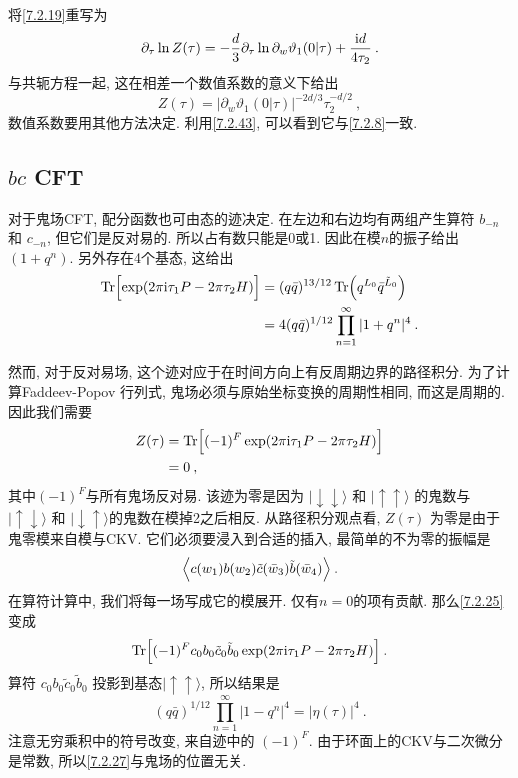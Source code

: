 将\eqref{7.2.19}重写为
\begin{equation}
\partial_{\tau} \ln Z(\tau)=-\frac{d}{3} \partial_{\tau} \ln \partial_{w} \vartheta_{1}(0 \vert \tau)+\frac{\mathrm{i} d}{4 \tau_{2}} \:. \label{7.2.21}
\end{equation}
与共轭方程一起, 这在相差一个数值系数的意义下给出
\begin{equation}
Z(\tau)=|\partial_{w} \vartheta_{1}(0 \vert \tau)|^{-2 d / 3} \tau_{2}^{-d / 2} \:, \label{7.2.22}
\end{equation}
数值系数要用其他方法决定. 利用\eqref{7.2.43}, 可以看到它与\eqref{7.2.8}一致.

\subsection*{$bc$ CFT}

对于鬼场CFT, 配分函数也可由态的迹决定. 在左边和右边均有两组产生算符 $b_{-n}$ 和 $c_{-n}$, 但它们是反对易的. 所以占有数只能是0或1. 
因此在模$n$的振子给出 $(1+q^{n})$. 另外存在4个基态, 这给出
\begin{align}
\operatorname{Tr}\Bigl[\exp (2 \pi \mathrm{i} \tau_{1} P-2 \pi \tau_{2} H)\Bigr] &= 
(q \bar{q})^{13 / 12} \operatorname{Tr}\Bigl(q^{L_{0}} \bar{q}^{\tilde{L}_{0}}\Bigr) \nonumber \\
&=4(q \bar{q})^{1 / 12} \prod_{n=1}^{\infty}|1+q^{n}|^{4} \:. \label{7.2.23}
\end{align}

然而, 对于反对易场, 这个迹对应于在时间方向上有反周期边界的路径积分. 为了计算Faddeev-Popov 行列式, 鬼场必须与原始坐标变换的周期性相同, 而这是周期的. 
因此我们需要
\begin{align}
Z(\tau) &=\operatorname{Tr}\Bigl[(-1)^{F} \exp (2 \pi \mathrm{i} \tau_{1} P-2 \pi \tau_{2} H)\Bigr] \nonumber \\
&=0 \:, \label{7.2.24}
\end{align}
其中$(-1)^{F}$与所有鬼场反对易. 该迹为零是因为 $\lvert \downarrow \downarrow\rangle$ 和 $\lvert\uparrow \uparrow\rangle$ 的鬼数与
$\lvert \uparrow \downarrow\rangle$ 和 $\lvert\downarrow \uparrow\rangle $的鬼数在模掉2之后相反. 从路径积分观点看, 
$Z(\tau)$ 为零是由于鬼零模来自模与CKV. 它们必须要浸入到合适的插入, 最简单的不为零的振幅是
\begin{equation}
\Bigl\langle c(w_{1}) b(w_{2}) \tilde{c}(\bar{w}_{3}) \tilde{b}(\bar{w}_{4})\Bigr\rangle \:. \label{7.2.25}
\end{equation}
在算符计算中, 我们将每一场写成它的模展开. 仅有$n=0$的项有贡献. 那么\eqref{7.2.25}变成
\begin{equation}
\operatorname{Tr}\Bigl[(-1)^{F} c_{0} b_{0} \tilde{c}_{0} \tilde{b}_{0} \exp (2 \pi \mathrm{i} \tau_{1} P-2 \pi \tau_{2} H)\Bigr] \:. \label{7.2.26}
\end{equation}
算符 $c_{0} b_{0} \tilde{c}_{0} \tilde{b}_{0}$ 投影到基态$\lvert\uparrow \uparrow\rangle$, 所以结果是
\begin{equation}
(q \bar{q})^{1 / 12} \prod_{n=1}^{\infty}|1-q^{n}|^{4}=|\eta(\tau)|^{4} \:. \label{7.2.27}
\end{equation}
注意无穷乘积中的符号改变, 来自迹中的 $(-1)^{F}$. 由于环面上的CKV与二次微分是常数, 所以\eqref{7.2.27}与鬼场的位置无关.

